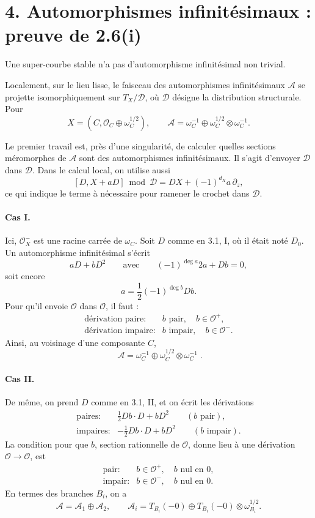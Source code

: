 \documentclass[11pt]{article}
\newcommand{\OO}{\mathcal O}
\newcommand{\cA}{\mathcal A}
\newcommand{\cD}{\mathcal D}
\newcommand{\om}{\omega}
\begin{document}
\section*{4. Automorphismes infinitésimaux : preuve de 2.6(i)}

Une super-courbe stable n'a pas d'automorphisme infinitésimal non trivial.

Localement, sur le lieu lisse, le faisceau des automorphismes infinitésimaux \(\cA\) se projette isomorphiquement sur \(T_X/\cD\), où \(\cD\) désigne la distribution structurale. Pour
\[
  X=(C,\OO_C\oplus \om_C^{1/2}),
  \qquad
  \cA=\omega_C^{-1}\oplus \omega_C^{1/2}\otimes\omega_C^{-1}.
\]

Le premier travail est, près d'une singularité, de calculer quelles sections méromorphes de \(\cA\) sont des automorphismes infinitésimaux. Il s'agit d'envoyer \(\cD\) dans \(\cD\). Dans le calcul local, on utilise aussi
\[
  [D,X+aD]\bmod \cD=DX+(-1)^{d_X}a\,\partial_z,
\]
ce qui indique le terme à nécessaire pour ramener le crochet dans \(\cD\).

\paragraph{Cas I.}
Ici, \(\OO_X^{-}\) est une racine carrée de \(\omega_C\). Soit \(D\) comme en 3.1, I, où il était noté \(D_0\). Un automorphisme infinitésimal s'écrit
\[
  aD+bD^2
  \qquad\text{avec}\qquad
  (-1)^{\deg a}2a+Db=0,
\]
soit encore
\[
  a=\frac12(-1)^{\deg b}Db.
\]
Pour qu'il envoie \(\OO\) dans \(\OO\), il faut :
\[
\begin{array}{ll}
\text{dérivation paire}:& b\text{ pair},\quad b\in\OO^{+},\\[1mm]
\text{dérivation impaire}:& b\text{ impair},\quad b\in\OO^{-}.
\end{array}
\]
Ainsi, au voisinage d'une composante \(C\),
\[
  \boxed{\;\cA=\omega_C^{-1}\oplus \omega_C^{1/2}\otimes\omega_C^{-1}\; }.
\]

\paragraph{Cas II.}
De même, on prend \(D\) comme en 3.1, II, et on écrit les dérivations
\[
\begin{array}{ll}
\text{paires}:&\displaystyle \frac12Db\cdot D+bD^2\qquad (b\text{ pair}),\\[3mm]
\text{impaires}:&\displaystyle -\frac12Db\cdot D+bD^2\qquad (b\text{ impair}).
\end{array}
\]
La condition pour que \(b\), section rationnelle de \(\OO\), donne lieu à une dérivation \(\OO\to\OO\), est
\[
\begin{array}{ll}
\text{pair}:& b\in\OO^{+},\quad b\text{ nul en }0,\\[1mm]
\text{impair}:& b\in\OO^{-},\quad b\text{ nul en }0.
\end{array}
\]
En termes des branches \(B_i\), on a
\[
  \cA=\cA_1\oplus\cA_2,
  \qquad
  \cA_i=T_{B_i}(-0)\oplus T_{B_i}(-0)\otimes\omega_{B_i}^{1/2}.
\]
\end{document}
